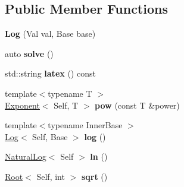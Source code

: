\subsection*{\-Public \-Member \-Functions}
\begin{DoxyCompactItemize}
\item 
\hypertarget{classlatex_1_1math_1_1Log_acff6d6f36adff38cf7c0da719516c6bc}{{\bfseries \-Log} (\-Val val, \-Base base)}\label{classlatex_1_1math_1_1Log_acff6d6f36adff38cf7c0da719516c6bc}

\item 
\hypertarget{classlatex_1_1math_1_1Log_a5d9819331208c23d8978a3744d058f14}{auto {\bfseries solve} ()}\label{classlatex_1_1math_1_1Log_a5d9819331208c23d8978a3744d058f14}

\item 
\hypertarget{classlatex_1_1math_1_1Log_a1bc90c91e52e7858e33dcdaba673b7a9}{std\-::string {\bfseries latex} () const }\label{classlatex_1_1math_1_1Log_a1bc90c91e52e7858e33dcdaba673b7a9}

\item 
\hypertarget{classlatex_1_1math_1_1Log_a4819a4a9a01dd7dd65a0d2773c589976}{{\footnotesize template$<$typename T $>$ }\\\hyperlink{classlatex_1_1math_1_1Exponent}{\-Exponent}$<$ \-Self, \-T $>$ {\bfseries pow} (const \-T \&power)}\label{classlatex_1_1math_1_1Log_a4819a4a9a01dd7dd65a0d2773c589976}

\item 
\hypertarget{classlatex_1_1math_1_1Log_aacf7a5312839b22b33fcb67ed3f51fde}{{\footnotesize template$<$typename Inner\-Base $>$ }\\\hyperlink{classlatex_1_1math_1_1Log}{\-Log}$<$ \-Self, \-Base $>$ {\bfseries log} ()}\label{classlatex_1_1math_1_1Log_aacf7a5312839b22b33fcb67ed3f51fde}

\item 
\hypertarget{classlatex_1_1math_1_1Log_a6ae7bf3b1ce862280b67b58f69d5c793}{\hyperlink{classlatex_1_1math_1_1NaturalLog}{\-Natural\-Log}$<$ \-Self $>$ {\bfseries ln} ()}\label{classlatex_1_1math_1_1Log_a6ae7bf3b1ce862280b67b58f69d5c793}

\item 
\hypertarget{classlatex_1_1math_1_1Log_a980f02ee52b6b81f1c7e7ccf75521a67}{\hyperlink{classlatex_1_1math_1_1Root}{\-Root}$<$ \-Self, int $>$ {\bfseries sqrt} ()}\label{classlatex_1_1math_1_1Log_a980f02ee52b6b81f1c7e7ccf75521a67}

\end{DoxyCompactItemize}
